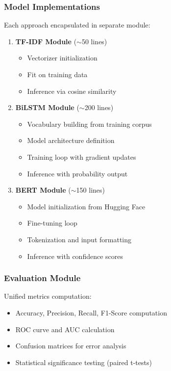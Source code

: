 \subsubsection{Model Implementations}

Each approach encapsulated in separate module:

\begin{enumerate}
  \item \textbf{TF-IDF Module} ($\sim$50 lines)
    \begin{itemize}
      \item Vectorizer initialization
      \item Fit on training data
      \item Inference via cosine similarity
    \end{itemize}
  
  \item \textbf{BiLSTM Module} ($\sim$200 lines)
    \begin{itemize}
      \item Vocabulary building from training corpus
      \item Model architecture definition
      \item Training loop with gradient updates
      \item Inference with probability output
    \end{itemize}
  
  \item \textbf{BERT Module} ($\sim$150 lines)
    \begin{itemize}
      \item Model initialization from Hugging Face
      \item Fine-tuning loop
      \item Tokenization and input formatting
      \item Inference with confidence scores
    \end{itemize}
\end{enumerate}

\subsubsection{Evaluation Module}

Unified metrics computation:

\begin{itemize}
  \item Accuracy, Precision, Recall, F1-Score computation
  \item ROC curve and AUC calculation
  \item Confusion matrices for error analysis
  \item Statistical significance testing (paired t-tests)
\end{itemize}

